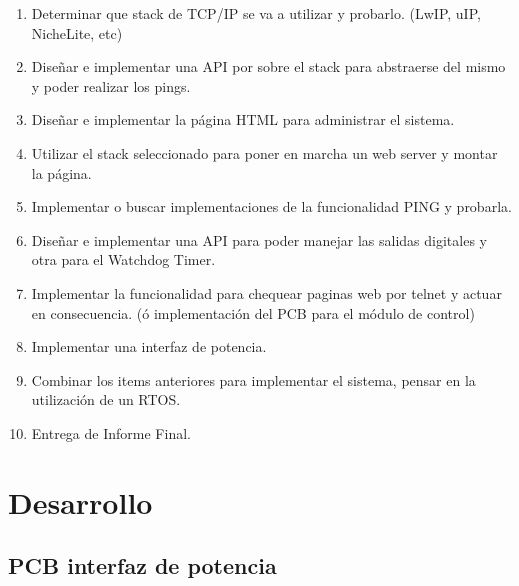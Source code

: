 \documentclass[a4paper,12pt]{article}
\begin{document}
\begin{enumerate}
\item Determinar que stack de TCP/IP se va a utilizar y probarlo. (LwIP, uIP, NicheLite, etc)
\item Diseñar e implementar una API por sobre el stack para abstraerse del mismo y poder realizar los pings.
\item Diseñar e implementar la página HTML para administrar el sistema.
\item Utilizar el stack seleccionado para poner en marcha un web server y montar la página.
\item Implementar o buscar implementaciones de la funcionalidad PING y probarla.
\item Diseñar e implementar una API para poder manejar las salidas digitales y otra para el Watchdog Timer.
\item Implementar la funcionalidad para chequear paginas web por telnet y actuar en consecuencia. (ó implementación del PCB para el módulo de control)
\item Implementar una interfaz de potencia. 
\item Combinar los items anteriores para implementar el sistema, pensar en la utilización de un RTOS.
\item Entrega de Informe Final.
\end{enumerate}



\newpage
\section{Desarrollo}
\subsection{PCB interfaz de potencia}
\end{document}
